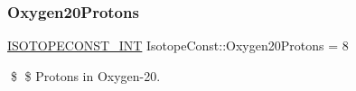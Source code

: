 \subsubsection{\texorpdfstring{Oxygen20\+Protons}{Oxygen20Protons}}
{\footnotesize\ttfamily \mbox{\hyperlink{group___isotope_const-_macros_ga5f18360b3e99483a35c32d789e62621c}{I\+S\+O\+T\+O\+P\+E\+C\+O\+N\+S\+T\+\_\+\+I\+NT}} Isotope\+Const\+::\+Oxygen20\+Protons = 8}

\$ \$ Protons in Oxygen-\/20. 